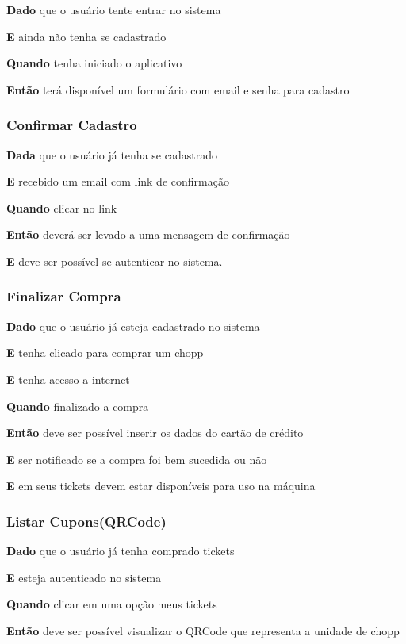 \textbf{Dado} que o usuário tente entrar no sistema 

\textbf{E} ainda não tenha se cadastrado

\textbf{Quando} tenha iniciado o aplicativo

\textbf{Então} terá disponível um formulário com email e senha para cadastro

\subsubsection{Confirmar Cadastro}

\textbf{Dada} que o usuário já tenha se cadastrado

\textbf{E} recebido um email com link de confirmação

\textbf{Quando} clicar no link

\textbf{Então} deverá ser levado a uma mensagem de confirmação

\textbf{E} deve ser possível se autenticar no sistema.

\subsubsection{Finalizar Compra}

\textbf{Dado} que o usuário já esteja cadastrado no sistema

\textbf{E} tenha clicado para comprar um chopp

\textbf{E} tenha acesso a internet

\textbf{Quando} finalizado a compra

\textbf{Então} deve ser possível inserir os dados do cartão de crédito

\textbf{E} ser notificado se a compra foi bem sucedida ou não

\textbf{E} em seus tickets devem estar disponíveis para uso na máquina

\subsubsection{Listar Cupons(QRCode)}

\textbf{Dado} que o usuário já tenha comprado tickets

\textbf{E} esteja autenticado no sistema

\textbf{Quando} clicar em uma opção meus tickets

\textbf{Então} deve ser possível  visualizar o QRCode que representa a unidade de chopp

